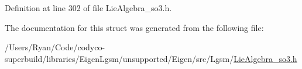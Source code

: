 Definition at line 302 of file Lie\+Algebra\+\_\+so3.\+h.



The documentation for this struct was generated from the following file\+:\begin{DoxyCompactItemize}
\item 
/\+Users/\+Ryan/\+Code/codyco-\/superbuild/libraries/\+Eigen\+Lgsm/unsupported/\+Eigen/src/\+Lgsm/\hyperlink{_lie_algebra__so3_8h}{Lie\+Algebra\+\_\+so3.\+h}\end{DoxyCompactItemize}

